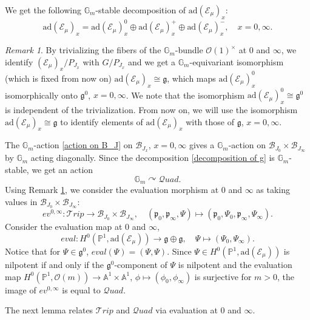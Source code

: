 \documentclass{amsart}
\newcommand{\cE}{\mathcal{E}}
\newcommand{\cQuad}{\mathcal{Q}uad}
\newcommand{\gm}{\mathbb{G}_{m}}
\theoremstyle{plain}
\theoremstyle{definition}
\theoremstyle{remark}
\newtheorem{remark}{Remark}[section]
\begin{document}
We get the following $\gm$-stable decomposition of $\text{ad}(\cE_{\mu})_{x}$:
\[
\text{ad}(\cE_{\mu})_{x}=\text{ad}(\cE_{\mu})_{x}^{0}\oplus\text{ad}(\cE_{\mu})_{x}^{+}\oplus\text{ad}(\cE_{\mu})_{x}^{-},\quad x=0,\infty.
\]

\begin{remark}\label{fiber isomorphism}
By trivializing the fibers of the $\gm$-bundle $\mathcal{O}(1)^{\times}$ at $0$ and $\infty$, we identify $(\cE_{\mu})_{x}/P_{J_{x}}$ with $G/P_{J_{x}}$ and we get
a $\gm$-equivariant isomorphism (which is fixed from now on) $\text{ad}(\cE_{\mu})_{x}\cong\mathfrak{g}$, which maps $\text{ad}(\cE_{\mu})_{x}^{0}$ isomorphically onto $\mathfrak{g}^{0}$, $x=0,\infty$. We note that the isomorphism $\text{ad}(\cE_{\mu})_{x}^{0}\cong\mathfrak{g}^{0}$ is independent of the trivialization. From now on, we will use the isomorphism $\text{ad}(\cE_{\mu})_{x}\cong\mathfrak{g}$ to identify elements of $\text{ad}(\cE_{\mu})_{x}$ with those of $\mathfrak{g}$, $x=0,\infty$.
\end{remark}
The $\mathbb G_{m}$-action \eqref{action on B_J} on $\mathcal{B}_{J_{x}}$, $x=0,\infty$ gives a $\gm$-action on $\mathcal{B}_{J_{0}}\times\mathcal{B}_{J_{\infty}}$ by $\gm$ acting diagonally. Since the decomposition \eqref{decomposition of g} is $\gm$-stable, we get an action
\begin{equation}\label{action on quad}
\gm\curvearrowright\mathcal{Q}uad.
\end{equation}
Using Remark \ref{fiber isomorphism}, we consider the evaluation morphism at $0$ and $\infty$ as taking values in $\mathcal{B}_{J_0}\times\mathcal{B}_{J_\infty}$:
\[
    ev^{0,\infty}:\mathcal{T}rip\rightarrow\mathcal{B}_{J_0}\times\mathcal{B}_{J_\infty},\quad
(\mathfrak{p}_{0},\mathfrak{p}_{\infty},\Psi)\mapsto (\mathfrak{p}_{0},\Psi_0,\mathfrak{p}_{\infty},\Psi_\infty).
\]
Consider the evaluation map at $0$ and $\infty$,
\[
    eval:H^{0}(\mathbb{P}^{1},\text{ad}(\cE_{\mu}))\rightarrow\mathfrak{g}\oplus\mathfrak{g},\quad\Psi\mapsto(\Psi_{0},\Psi_{\infty}).
\]
Notice that for $\Psi\in\mathfrak{g}^{0}$, $eval(\Psi)=(\Psi,\Psi)$. Since $\Psi\in H^{0}(\mathbb{P}^{1},\text{ad}(\cE_{\mu}))$ is nilpotent if and only if the $\mathfrak{g}^{0}$-component of $\Psi$ is nilpotent and the evaluation map $H^{0}(\mathbb{P}^{1},\mathcal{O}(m))\rightarrow\mathbb{A}^{1}\times\mathbb{A}^{1}$, $\phi\mapsto(\phi_{0},\phi_{\infty})$ is surjective for $m>0$, the image of $ev^{0,\infty}$ is equal to $\cQuad$.

The next lemma relates $\mathcal{T}rip$ and $\cQuad$ via evaluation at $0$ and $\infty$.
\end{document}
